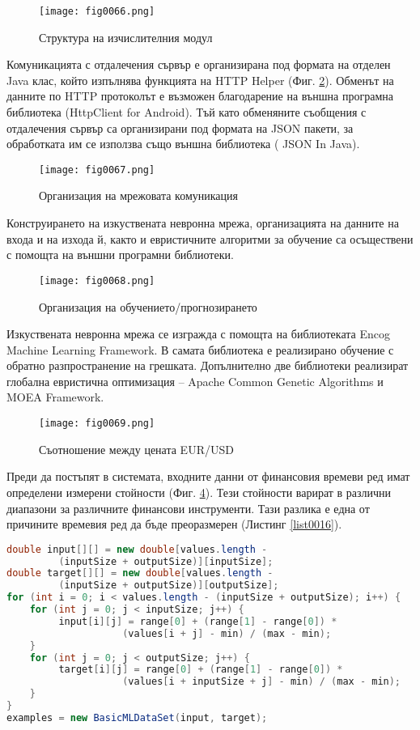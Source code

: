 \begin{figure}[H]
  \centering
  \texttt{[image: fig0066.png]}
  \caption{Структура на изчислителния модул}
\label{fig0066}
\end{figure}

Комуникацията с отдалечения сървър е организирана под формата на отделен Java клас, който изпълнява функцията на HTTP Helper (Фиг. \ref{fig0067}). Обменът на данните по HTTP протоколът е възможен благодарение на външна програмна библиотека (HttpClient for Android). Тъй като обменяните съобщения с отдалечения сървър са организирани под формата на JSON пакети, за обработката им се използва също външна библиотека (
JSON In Java).

\begin{figure}[H]
  \centering
  \texttt{[image: fig0067.png]}
  \caption{Организация на мрежовата комуникация}
\label{fig0067}
\end{figure}

Конструирането на изкуствената невронна мрежа, организацията на данните на входа и на изхода й, както и евристичните алгоритми за обучение са осъществени с помощта на външни програмни библиотеки. 

\begin{figure}[H]
  \centering
  \texttt{[image: fig0068.png]}
  \caption{Организация на обучението/прогнозирането}
\label{fig0068}
\end{figure}

Изкуствената невронна мрежа се изгражда с помощта на библиотеката Encog Machine Learning Framework. В самата библиотека е реализирано обучение с обратно разпространение на грешката. Допълнително две библиотеки реализират глобална евристична оптимизация – Apache Common Genetic Algorithms и MOEA Framework.

\begin{figure}[H]
  \centering
  \texttt{[image: fig0069.png]}
  \caption{Съотношение между цената EUR/USD}
\label{fig0069}
\end{figure}

Преди да постъпят в системата, входните данни от финансовия времеви ред имат определени измерени стойности (Фиг. \ref{fig0069}). Тези стойности варират в различни диапазони за различните финансови инструменти. Тази разлика е една от причините времевия ред да бъде преоразмерен (Листинг \ref{list0016}).

\begin{lstlisting}[caption=Преоразмеряване на входните данни, language=Java, basicstyle=\tiny, label=list0016]
double input[][] = new double[values.length -
		 (inputSize + outputSize)][inputSize];
double target[][] = new double[values.length -
		 (inputSize + outputSize)][outputSize];
for (int i = 0; i < values.length - (inputSize + outputSize); i++) {
	for (int j = 0; j < inputSize; j++) {
		 input[i][j] = range[0] + (range[1] - range[0]) *
					(values[i + j] - min) / (max - min);
	}
	for (int j = 0; j < outputSize; j++) {
		 target[i][j] = range[0] + (range[1] - range[0]) *
					(values[i + inputSize + j] - min) / (max - min);
	}
}
examples = new BasicMLDataSet(input, target);
\end{lstlisting}

